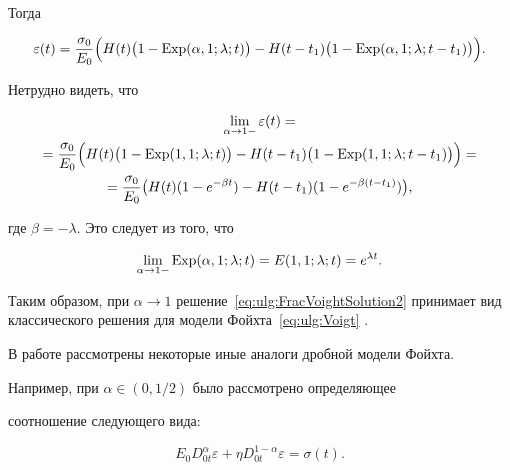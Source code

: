 Тогда

\begin{equation}\label{eq:ulg:FracVoightSolution2}

\varepsilon(t)=\frac{\sigma_{0}}{E_{0}}

\Bigl(H(t) \bigl(1-  \mathop{\rm Exp}\nolimits  (\alpha,1;\lambda;t)\bigr)-H(t-t_{1}) \bigl(1-  \mathop{\rm Exp}\nolimits  (\alpha,1;\lambda;t-t_{1}) \bigr)\Bigr).

\end{equation}

Нетрудно видеть, что

\begin{multline*}

\lim\limits_{\alpha\rightarrow

1-}\varepsilon(t)= \\ =

\frac{\sigma_{0}}{E_{0}}

\Bigl(

H(t)\bigl(1-  \mathop{\rm Exp}\nolimits  (1, 1;\lambda;t)\bigr)-

H(t-t_{1})\bigl(1-  \mathop{\rm Exp}\nolimits  (1, 1;\lambda;t-t_{1})\bigr)\Bigr)=\\

=\frac{\sigma_{0}}{E_{0}}\bigl(H(t)(1-e^{-\beta t})-H(t-t_{1})(1-e^{-\beta(t-t_{1})})\bigr),

\end{multline*}

где $\beta=-\lambda$. Это следует из того, что 

$$\lim_{\alpha\to1-}  \mathop{\rm Exp}\nolimits  (\alpha,1;\lambda;t)=E(1, 1;\lambda;t)=e^{\lambda t}.$$ 

Таким образом, при $\alpha\rightarrow 1$ решение~\eqref{eq:ulg:FracVoightSolution2} принимает вид классического решения для модели Фойхта~\eqref{eq:ulg:Voigt} .



В работе \cite{ulg:bib:ORY_reology_models} рассмотрены некоторые иные аналоги дробной модели Фойхта. 

Например, при $\alpha\in(0, 1/2)$ было рассмотрено определяющее

соотношение следующего вида:

\begin{equation}\label{eq:ulg:Voigt1-a}

E_{0}D_{0t}^{\alpha}\varepsilon+\eta D_{0t}^{1-\alpha}\varepsilon=\sigma(t).

\end{equation}

